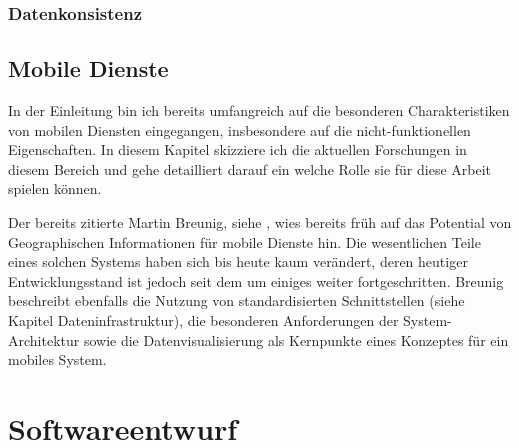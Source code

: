 \subsection{Datenkonsistenz}

\section{Mobile Dienste}
In der Einleitung bin ich bereits umfangreich auf die besonderen Charakteristiken von mobilen Diensten eingegangen, insbesondere auf die nicht-funktionellen Eigenschaften. In diesem Kapitel skizziere ich die aktuellen Forschungen in diesem Bereich und gehe detailliert darauf ein welche Rolle sie für diese Arbeit spielen können.

Der bereits zitierte Martin Breunig, siehe \citep{breunig_entwicklung_2003}, wies bereits früh auf das Potential von Geographischen Informationen für mobile Dienste hin. Die wesentlichen Teile eines solchen Systems haben sich bis heute kaum verändert, deren heutiger Entwicklungsstand ist jedoch seit dem um einiges weiter fortgeschritten. Breunig beschreibt ebenfalls die Nutzung von standardisierten Schnittstellen (siehe Kapitel Dateninfrastruktur), die besonderen Anforderungen der System-Architektur sowie die Datenvisualisierung als Kernpunkte eines Konzeptes für ein mobiles System.


\chapter{Softwareentwurf}
